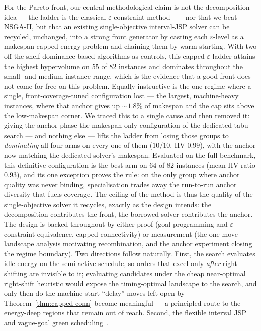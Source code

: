 \documentclass[preprint,12pt]{elsarticle}
\begin{document}
For the Pareto front, our central methodological claim is not the
decomposition idea --- the ladder is the classical $\varepsilon$-constraint
method~\cite{Haimes1971} --- nor that we beat NSGA-II, but that an existing
single-objective interval-JSP solver can be recycled, unchanged, into a strong
front generator by casting each $\varepsilon$-level as a makespan-capped energy
problem and chaining them by warm-starting. With two off-the-shelf
dominance-based algorithms as controls, this capped $\varepsilon$-ladder
attains the highest hypervolume on $55$ of $82$ instances and dominates
throughout the small- and medium-instance range, which is the evidence that a
good front does not come for free on this problem. Equally instructive is the
one regime where a single, front-coverage-tuned configuration lost --- the
largest, machine-heavy instances, where that anchor gives up ${\sim}1.8\%$ of
makespan and the cap sits above the low-makespan corner. We traced this to a
single cause and then removed it: giving the anchor phase the makespan-only
configuration of the dedicated tabu search --- and nothing else --- lifts the
ladder from losing those groups to \emph{dominating} all four arms on every
one of them ($10/10$, HV $0.99$), with the anchor now matching the dedicated
solver's makespan. Evaluated on the full benchmark, this definitive
configuration is the best arm on $64$ of $82$ instances (mean HV ratio
$0.93$), and its one exception proves the rule: on the only group where
anchor quality was never binding, specialisation trades away the run-to-run
anchor diversity that fuels coverage. The ceiling of the method is thus the
quality of the single-objective solver it recycles, exactly as the design
intends: the decomposition contributes the front, the borrowed solver
contributes the anchor. The design is backed throughout by either proof (goal-programming and
$\varepsilon$-constraint equivalence, capped connectivity) or measurement (the
one-move landscape analysis motivating recombination, and the anchor
experiment closing the regime boundary). Two directions follow naturally.
First, the search evaluates idle energy on the semi-active schedule, so
orders that excel only \emph{after} right-shifting are invisible to it;
evaluating candidates under the cheap near-optimal right-shift heuristic
would expose the timing-optimal landscape to the search, and only then do
the machine-start ``delay'' moves left open by
Theorem~\ref{thm:capped-conn} become meaningful --- a principled route to
the energy-deep regions that remain out of reach. Second, the flexible
interval JSP and vague-goal green scheduling~\cite{GarciaGomez2026}.
\end{document}
